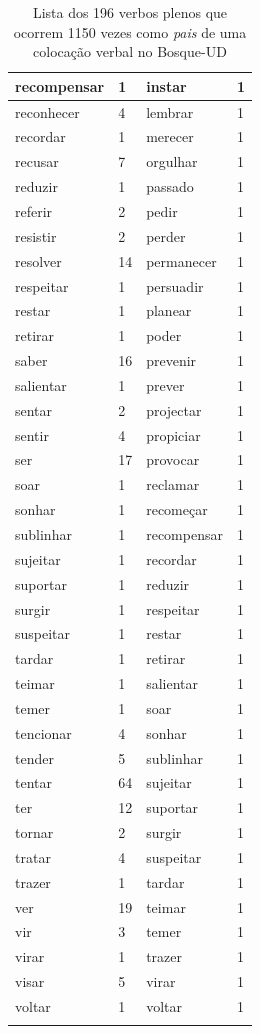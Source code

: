 \documentclass[output=paper,colorlinks,citecolor=brown]{langscibook}
\begin{document}
\begin{longtable}{ p{3cm} | p{1cm} | p{3cm} | p{1cm} }
			recompensar & 1 & instar & 1\\\hline
			reconhecer & 4 & lembrar & 1\\\hline
			recordar & 1 & merecer & 1\\\hline
			recusar & 7 & orgulhar & 1\\\hline
			reduzir & 1 & passado & 1\\\hline
			referir & 2 & pedir & 1\\\hline
			resistir & 2 & perder & 1\\\hline
			resolver & 14 & permanecer & 1\\\hline
			respeitar & 1 & persuadir & 1\\\hline
			restar & 1 & planear & 1\\\hline
			retirar & 1 & poder & 1\\\hline
			saber & 16 & prevenir & 1\\\hline
			salientar & 1 & prever & 1\\\hline
			sentar & 2 & projectar & 1\\\hline
			sentir & 4 & propiciar & 1\\\hline
			ser & 17 & provocar & 1\\\hline
			soar & 1 & reclamar & 1\\\hline
			sonhar & 1 & recomeçar & 1\\\hline
			sublinhar & 1 & recompensar & 1\\\hline
			sujeitar & 1 & recordar & 1\\\hline
			suportar & 1 & reduzir & 1\\\hline
			surgir & 1 & respeitar & 1\\\hline
			suspeitar & 1 & restar & 1\\\hline
			tardar & 1 & retirar & 1\\\hline
			teimar & 1 & salientar & 1\\\hline
			temer & 1 & soar & 1\\\hline
			tencionar & 4 & sonhar & 1\\\hline
			tender & 5 & sublinhar & 1\\\hline
			tentar & 64 & sujeitar & 1\\\hline
			ter & 12 & suportar & 1\\\hline
			tornar & 2 & surgir & 1\\\hline
			tratar & 4 & suspeitar & 1\\\hline
			trazer & 1 & tardar & 1\\\hline
			ver & 19 & teimar & 1\\\hline
			vir & 3 & temer & 1\\\hline
			virar & 1 & trazer & 1\\\hline
			visar & 5 & virar & 1\\\hline
			voltar & 1 & voltar & 1\\\hline
			\caption{Lista dos 196 verbos plenos que ocorrem 1150 vezes como \emph{pais} de uma colocação verbal no Bosque-UD}
			\label{tab:nãolocverbal}
		\end{longtable}
\end{document}
